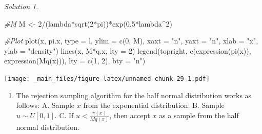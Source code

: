 \documentclass[
]{book}
\newenvironment{Shaded}{\begin{snugshade}}{\end{snugshade}}
\newcommand{\AttributeTok}[1]{\textcolor[rgb]{0.77,0.63,0.00}{#1}}
\newcommand{\CommentTok}[1]{\textcolor[rgb]{0.56,0.35,0.01}{\textit{#1}}}
\newcommand{\DecValTok}[1]{\textcolor[rgb]{0.00,0.00,0.81}{#1}}
\newcommand{\FloatTok}[1]{\textcolor[rgb]{0.00,0.00,0.81}{#1}}
\newcommand{\FunctionTok}[1]{\textcolor[rgb]{0.00,0.00,0.00}{#1}}
\newcommand{\NormalTok}[1]{#1}
\newcommand{\OtherTok}[1]{\textcolor[rgb]{0.56,0.35,0.01}{#1}}
\newcommand{\SpecialCharTok}[1]{\textcolor[rgb]{0.00,0.00,0.00}{#1}}
\newcommand{\StringTok}[1]{\textcolor[rgb]{0.31,0.60,0.02}{#1}}
\providecommand{\tightlist}{%
  \setlength{\itemsep}{0pt}\setlength{\parskip}{0pt}}
\theoremstyle{definition}
\theoremstyle{definition}
\theoremstyle{definition}
\theoremstyle{definition}
\theoremstyle{remark}
\newtheorem*{solution}{Solution}
\begin{document}
\begin{solution}
\begin{Shaded}
\begin{Highlighting}[]
\CommentTok{\#M}
\NormalTok{M }\OtherTok{\textless{}{-}} \DecValTok{2}\SpecialCharTok{/}\NormalTok{(lambda}\SpecialCharTok{*}\FunctionTok{sqrt}\NormalTok{(}\DecValTok{2}\SpecialCharTok{*}\NormalTok{pi))}\SpecialCharTok{*}\FunctionTok{exp}\NormalTok{(}\FloatTok{0.5}\SpecialCharTok{*}\NormalTok{lambda}\SpecialCharTok{\^{}}\DecValTok{2}\NormalTok{)}

\CommentTok{\#Plot}
\FunctionTok{plot}\NormalTok{(x, pi.x, }\AttributeTok{type =} \StringTok{\textquotesingle{}l\textquotesingle{}}\NormalTok{, }\AttributeTok{ylim =} \FunctionTok{c}\NormalTok{(}\DecValTok{0}\NormalTok{, M), }\AttributeTok{xaxt =} \StringTok{"n"}\NormalTok{, }\AttributeTok{yaxt =} \StringTok{"n"}\NormalTok{, }\AttributeTok{xlab =} \StringTok{"x"}\NormalTok{, }\AttributeTok{ylab =} \StringTok{"density"}\NormalTok{)}
\FunctionTok{lines}\NormalTok{(x, M}\SpecialCharTok{*}\NormalTok{q.x, }\AttributeTok{lty =} \DecValTok{2}\NormalTok{)}
\FunctionTok{legend}\NormalTok{(}\StringTok{\textquotesingle{}topright\textquotesingle{}}\NormalTok{, }\FunctionTok{c}\NormalTok{(}\FunctionTok{expression}\NormalTok{(}\FunctionTok{pi}\NormalTok{(x)), }\FunctionTok{expression}\NormalTok{(}\FunctionTok{Mq}\NormalTok{(x))), }\AttributeTok{lty =} \FunctionTok{c}\NormalTok{(}\DecValTok{1}\NormalTok{, }\DecValTok{2}\NormalTok{), }\AttributeTok{bty =} \StringTok{"n"}\NormalTok{)}
\end{Highlighting}
\end{Shaded}

\texttt{[image: \_main\_files/figure-latex/unnamed-chunk-29-1.pdf]}

\begin{enumerate}
\def\labelenumi{\arabic{enumi}.}
\setcounter{enumi}{2}
\tightlist
\item
  The rejection sampling algorithm for the half normal distribution works as follows:
  A. Sample \(x\) from the exponential distribution.
  B. Sample \(u \sim U[0, 1]\).
  C. If \(u < \frac{\pi(x)}{Mq(x)}\), then accept \(x\) as a sample from the half normal distribution.
\end{enumerate}

\end{solution}
\end{document}
